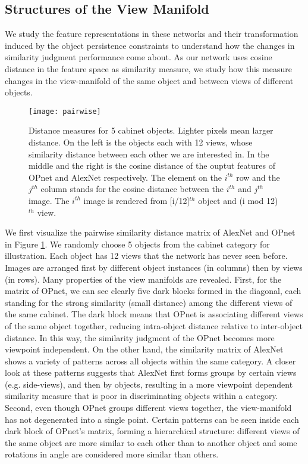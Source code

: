 \documentclass{article} %
\begin{document}
\subsection{Structures of the View Manifold}
We study the feature representations in these networks and their transformation induced by the object persistence constraints to understand how the changes in similarity judgment performance come about. As our network uses cosine distance in the feature space as similarity measure, we study how this measure changes in the view-manifold of the same object and between views of different objects.

\begin{figure}[htbp]
\centering
\texttt{[image: pairwise]}
\caption{Distance measures for 5 cabinet objects. Lighter pixels mean larger distance. On the left is the objects each with 12 views, whose similarity distance between each other we are interested in. In the middle and the right is the cosine distance of the ouptut features of OPnet and AlexNet respectively. The element on the $i^{th}$ row and the $j^{th}$ column stands for the cosine distance between the $i^{th}$ and $j^{th}$ image. The $i^{th}$ image is rendered from [i/12]$^{th}$ object and (i mod 12)$^{th}$ view.}
\label{fig:pairwise}
\end{figure}
We first visualize the pairwise similarity distance matrix of AlexNet and OPnet in Figure \ref{fig:pairwise}. We randomly choose 5 objects from the cabinet category for illustration. Each object has 12 views that the network has never seen before. Images are arranged first by different object instances (in columns)  then by views (in rows). Many properties of the view manifolds are revealed. First, for the matrix of OPnet, we can see clearly five dark blocks formed in the diagonal, each standing for the strong similarity (small distance) among the different views of the same cabinet. The dark block means that OPnet is associating different views of the same object together, reducing intra-object distance relative to inter-object distance. In this way, the similarity judgment of the OPnet becomes more viewpoint independent. On the other hand, the similarity matrix of AlexNet shows a variety of patterns across all objects within the same category. A closer look at these patterns suggests that AlexNet first forms groups by certain views (e.g. side-views), and then by objects, resulting in a more viewpoint dependent similarity measure that is poor in discriminating objects within a category. Second, even though OPnet groups different views together, the view-manifold has not degenerated into a single point. Certain patterns can be seen inside each dark block of OPnet's matrix, forming a hierarchical structure: different views of the same object are more similar to each other than to another object and some rotations in angle are considered more similar than others.  
\end{document}
